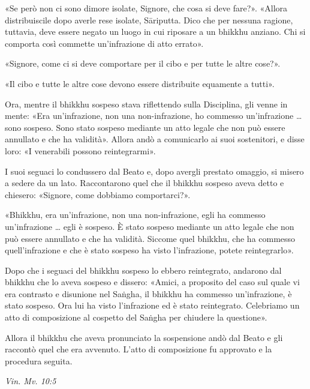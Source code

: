 «Se però non ci sono dimore isolate, Signore, che cosa si deve fare?».
«Allora distribuiscile dopo averle rese isolate, Sāriputta. Dico che per
nessuna ragione, tuttavia, deve essere negato un luogo in cui riposare a
un bhikkhu anziano. Chi si comporta così commette un’infrazione di atto
errato».


«Signore, come ci si deve comportare per il cibo e per tutte le altre
cose?».


«Il cibo e tutte le altre cose devono essere distribuite equamente a
tutti».


Ora, mentre il bhikkhu sospeso stava riflettendo sulla Disciplina, gli
venne in mente: «Era un’infrazione, non una non-infrazione, ho commesso
un’infrazione … sono sospeso. Sono stato sospeso mediante un atto legale
che non può essere annullato e che ha validità». Allora andò a
comunicarlo ai suoi sostenitori, e disse loro: «I venerabili possono
reintegrarmi».


I suoi seguaci lo condussero dal Beato e, dopo avergli prestato omaggio,
si misero a sedere da un lato. Raccontarono quel che il bhikkhu sospeso
aveva detto e chiesero: «Signore, come dobbiamo comportarci?».


«Bhikkhu, era un’infrazione, non una non-infrazione, egli ha commesso
un’infrazione … egli è sospeso. È stato sospeso mediante un atto legale
che non può essere annullato e che ha validità. Siccome quel bhikkhu,
che ha commesso quell’infrazione e che è stato sospeso ha visto
l’infrazione, potete reintegrarlo».


Dopo che i seguaci del bhikkhu sospeso lo ebbero reintegrato, andarono
dal bhikkhu che lo aveva sospeso e dissero: «Amici, a proposito del caso
sul quale vi era contrasto e disunione nel Saṅgha, il bhikkhu ha
commesso un’infrazione, è stato sospeso. Ora lui ha visto l’infrazione
ed è stato reintegrato. Celebriamo un atto di composizione al cospetto
del Saṅgha per chiudere la questione».


Allora il bhikkhu che aveva pronunciato la sospensione andò dal Beato e
gli raccontò quel che era avvenuto. L’atto di composizione fu approvato
e la procedura seguita.


\emph{Vin. Mv. 10:5}


